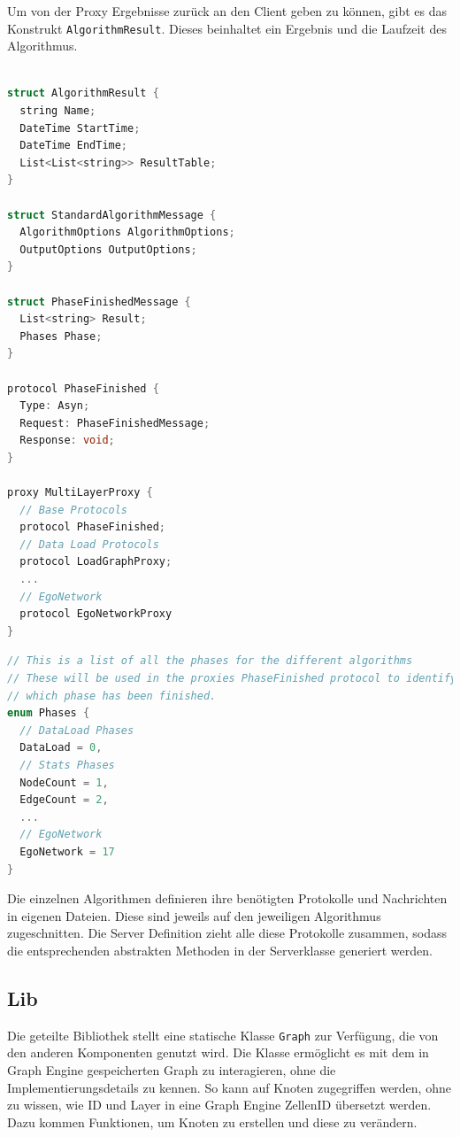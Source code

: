 Um von der Proxy Ergebnisse zurück an den Client geben zu können, gibt es das Konstrukt \verb|AlgorithmResult|. Dieses beinhaltet ein Ergebnis und die Laufzeit des Algorithmus.


\begin{lstlisting}[language=c, caption={Definition für die Proxy Protokolle.}]

struct AlgorithmResult {
  string Name;
  DateTime StartTime;
  DateTime EndTime;
  List<List<string>> ResultTable;
}

struct StandardAlgorithmMessage {
  AlgorithmOptions AlgorithmOptions;
  OutputOptions OutputOptions;
}

struct PhaseFinishedMessage {
  List<string> Result;
  Phases Phase;
}

protocol PhaseFinished {
  Type: Asyn;
  Request: PhaseFinishedMessage;
  Response: void;
}

proxy MultiLayerProxy {
  // Base Protocols
  protocol PhaseFinished;
  // Data Load Protocols
  protocol LoadGraphProxy;
  ...
  // EgoNetwork
  protocol EgoNetworkProxy
}
\end{lstlisting}


\begin{lstlisting}[language=c, caption={Definition der einzelnen Phasen.}]
// This is a list of all the phases for the different algorithms
// These will be used in the proxies PhaseFinished protocol to identify
// which phase has been finished.
enum Phases {
  // DataLoad Phases
  DataLoad = 0,
  // Stats Phases
  NodeCount = 1,
  EdgeCount = 2,
  ...
  // EgoNetwork
  EgoNetwork = 17
}
\end{lstlisting}


Die einzelnen Algorithmen definieren ihre benötigten Protokolle und Nachrichten in eigenen Dateien. Diese sind jeweils auf den jeweiligen Algorithmus zugeschnitten.
Die Server Definition zieht alle diese Protokolle zusammen, sodass die entsprechenden abstrakten Methoden in der Serverklasse generiert werden.

\subsection{Lib}


Die geteilte Bibliothek stellt eine statische Klasse \verb|Graph| zur Verfügung, die von den anderen Komponenten genutzt wird. Die Klasse ermöglicht es mit dem in Graph Engine gespeicherten Graph zu interagieren, ohne die Implementierungsdetails zu kennen. So kann auf Knoten zugegriffen werden, ohne zu wissen, wie ID und Layer in eine Graph Engine ZellenID übersetzt werden. 
Dazu kommen Funktionen, um Knoten zu erstellen und diese zu verändern.


